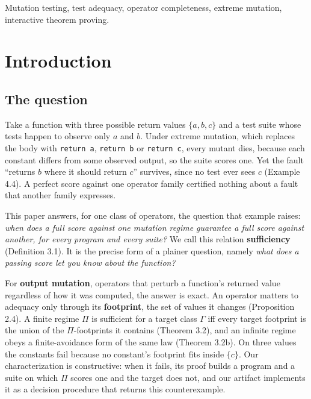 \documentclass[conference]{IEEEtran}
\theoremstyle{run}
\begin{document}
\begin{abstract}
characterization and its corollaries are mechanized in Lean 4 / Mathlib, and a theorem ledger identifies the results proved only on paper. Our artifact includes a decision procedure for finite sufficiency that returns the theorem's counterexample.
\end{abstract}
\begin{IEEEkeywords}
Mutation testing, test adequacy, operator completeness, extreme mutation, interactive theorem proving.
\end{IEEEkeywords}

\setcounter{section}{0}
\section{Introduction}
\setcounter{subsection}{0}
\subsection{The question}
Take a function with three possible return values $\{a, b, c\}$ and a test suite whose tests happen to observe only $a$ and $b$. Under extreme mutation, which replaces the body with \texttt{return a}, \texttt{return b} or \texttt{return c}, every mutant dies, because each constant differs from some observed output, so the suite scores one. Yet the fault ``returns $b$ where it should return $c$'' survives, since no test ever sees $c$ (Example 4.4). A perfect score against one operator family certified nothing about a fault that another family expresses.

This paper answers, for one class of operators, the question that example raises: \emph{when does a full score against one mutation regime guarantee a full score against another, for every program and every suite?} We call this relation \textbf{sufficiency} (Definition 3.1). It is the precise form of a plainer question, namely \emph{what does a passing score let you know about the function?}

For \textbf{output mutation}, operators that perturb a function's returned value regardless of how it was computed, the answer is exact. An operator matters to adequacy only through its \textbf{footprint}, the set of values it changes (Proposition 2.4). A finite regime $\Pi$ is sufficient for a target class $\Gamma$ iff every target footprint is the union of the $\Pi$-footprints it contains (Theorem 3.2), and an infinite regime obeys a finite-avoidance form of the same law (Theorem 3.2b). On three values the constants fail because no constant's footprint fits inside $\{c\}$. Our characterization is constructive: when it fails, its proof builds a program and a suite on which $\Pi$ scores one and the target does not, and our artifact implements it as a decision procedure that returns this counterexample.
\end{document}
